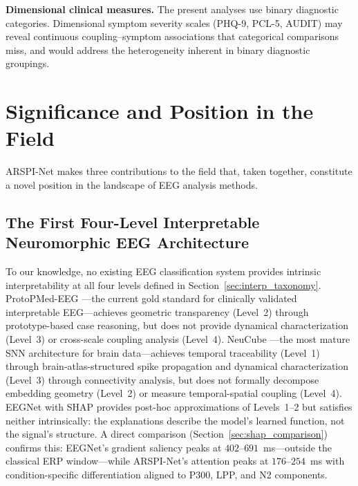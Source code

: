 \textbf{Dimensional clinical measures.} The present analyses use binary diagnostic categories. Dimensional symptom severity scales (PHQ-9, PCL-5, AUDIT) may reveal continuous coupling--symptom associations that categorical comparisons miss, and would address the heterogeneity inherent in binary diagnostic groupings.


\section{Significance and Position in the Field}
\label{sec:significance}

ARSPI-Net makes three contributions to the field that, taken together, constitute a novel position in the landscape of EEG analysis methods.

\subsection{The First Four-Level Interpretable Neuromorphic EEG Architecture}

To our knowledge, no existing EEG classification system provides intrinsic interpretability at all four levels defined in Section~\ref{sec:interp_taxonomy}. ProtoPMed-EEG \cite{barnett_protopmed_2024}---the current gold standard for clinically validated interpretable EEG---achieves geometric transparency (Level~2) through prototype-based case reasoning, but does not provide dynamical characterization (Level~3) or cross-scale coupling analysis (Level~4). NeuCube \cite{kasabov_neucube_2014}---the most mature SNN architecture for brain data---achieves temporal traceability (Level~1) through brain-atlas-structured spike propagation and dynamical characterization (Level~3) through connectivity analysis, but does not formally decompose embedding geometry (Level~2) or measure temporal-spatial coupling (Level~4). EEGNet with SHAP provides post-hoc approximations of Levels~1--2 but satisfies neither intrinsically: the explanations describe the model's learned function, not the signal's structure. A direct comparison (Section~\ref{sec:shap_comparison}) confirms this: EEGNet's gradient saliency peaks at $402$--$691$~ms---outside the classical ERP window---while ARSPI-Net's attention peaks at $176$--$254$~ms with condition-specific differentiation aligned to P300, LPP, and N2 components.


